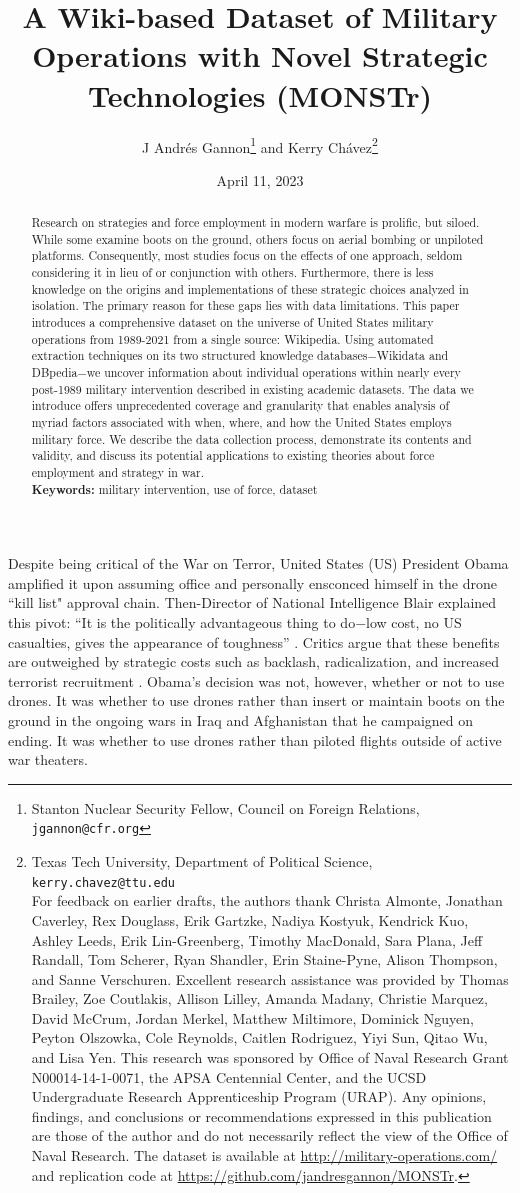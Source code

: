 \documentclass[fleqn,12pt]{article}
\title{\singlespacing A Wiki-based Dataset of Military Operations with Novel Strategic Technologies (MONSTr)}
\author{J Andr\'{e}s Gannon{\thanks{Stanton Nuclear Security Fellow, Council on Foreign Relations, \texttt{jgannon@cfr.org}} } and Kerry Ch\'{a}vez{\thanks{Texas Tech University, Department of Political Science, \texttt{kerry.chavez@ttu.edu} \\
For feedback on earlier drafts, the authors thank Christa Almonte, Jonathan Caverley, Rex Douglass, Erik Gartzke, Nadiya Kostyuk, Kendrick Kuo, Ashley Leeds, Erik Lin-Greenberg, Timothy MacDonald, Sara Plana, Jeff Randall, Tom Scherer, Ryan Shandler, Erin Staine-Pyne, Alison Thompson, and Sanne Verschuren. Excellent research assistance was provided by Thomas Brailey, Zoe Coutlakis, Allison Lilley, Amanda Madany, Christie Marquez, David McCrum, Jordan Merkel, Matthew Miltimore, Dominick Nguyen, Peyton Olszowka, Cole Reynolds, Caitlen Rodriguez, Yiyi Sun, Qitao Wu, and Lisa Yen. This research was sponsored by Office of Naval Research Grant N00014-14-1-0071, the APSA Centennial Center, and the UCSD Undergraduate Research Apprenticeship Program (URAP). Any opinions, findings, and conclusions or recommendations expressed in this publication are those of the author and do not necessarily reflect the view of the Office of Naval Research. The dataset is available at \href{http://military-operations.com/}{http://military-operations.com/} and replication code at \href{https://github.com/jandresgannon/MONSTr}{https://github.com/jandresgannon/MONSTr}.}}}
\date{April 11, 2023}
\begin{document}
	\maketitle
	\thispagestyle{empty}
	\setcounter{page}{0}
	\vspace{-0.4in}
	\begin{abstract}
            \singlespacing \noindent Research on strategies and force employment in modern warfare is prolific, but siloed. While some examine boots on the ground, others focus on aerial bombing or unpiloted platforms. Consequently, most studies focus on the effects of one approach, seldom considering it in lieu of or conjunction with others. Furthermore, there is less knowledge on the origins and implementations of these strategic choices analyzed in isolation. The primary reason for these gaps lies with data limitations. This paper introduces a comprehensive dataset on the universe of United States military operations from 1989-2021 from a single source: Wikipedia. Using automated extraction techniques on its two structured knowledge databases$-$Wikidata and DBpedia$-$we uncover information about individual operations within nearly every post-1989 military intervention described in existing academic datasets. The data we introduce offers unprecedented coverage and granularity that enables analysis of myriad factors associated with when, where, and how the United States employs military force. We describe the data collection process, demonstrate its contents and validity, and discuss its potential applications to existing theories about force employment and strategy in war. \\ \vspace{.1in}
	\noindent
	\textbf{Keywords:} military intervention, use of force, dataset
	\end{abstract}
	
\newpage
\noindent

Despite being critical of the War on Terror, United States (US) President Obama amplified it upon assuming office and personally ensconced himself in the drone ``kill list" approval chain. Then-Director of National Intelligence Blair explained this pivot: ``It is the politically advantageous thing to do$-$low cost, no US casualties, gives the appearance of toughness” \citep{becker_secretkilllist_2012}. Critics argue that these benefits are outweighed by strategic costs such as backlash, radicalization, and increased terrorist recruitment \citep{kilcullen_opiniondeathoutrage_2009}. Obama's decision was not, however, whether or not to use drones. It was whether to use drones rather than insert or maintain boots on the ground in the ongoing wars in Iraq and Afghanistan that he campaigned on ending. It was whether to use drones rather than piloted flights outside of active war theaters.
	
\end{document}
